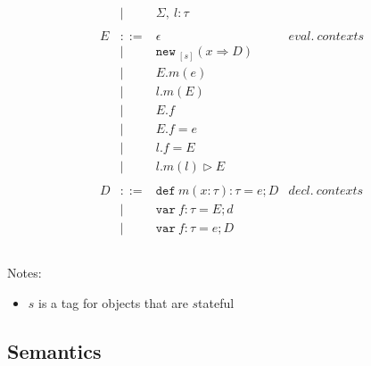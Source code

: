 \documentclass{llncs}
\newcommand{\keywadj}[1]{\mathtt{#1}}
\newcommand{\keyw}[1]{\keywadj{#1}~}
\begin{document}
\[\begin{array}{lll}
\begin{array}{lllr}
& | & \Sigma,~l : \tau\\
&&\\
E & ::= & \epsilon & eval.~ contexts\\
  & |   & \keyw{new}_{[s]}(x \Rightarrow D) \\
  & |   & E.m(e)\\
  & |   & l.m(E)\\
  & |   & E.f \\
  & |   & E.f = e \\
  & |   & l.f = E \\
  & |   & l.m(l) \rhd E \\
&&\\
D & ::= & \keyw{def} m(x:\tau):\tau = e; D & decl.~ contexts\\
  & |   & \keyw{var} f:\tau = E; d \\
  & |   & \keyw{var} f:\tau = e; D \\
&&\\
\end{array}
\end{array}
\]

Notes:

\begin{itemize}
\item $s$ is a tag for objects that are $s$tateful
\end{itemize}

\newpage

\subsection{Semantics}
\end{document}
